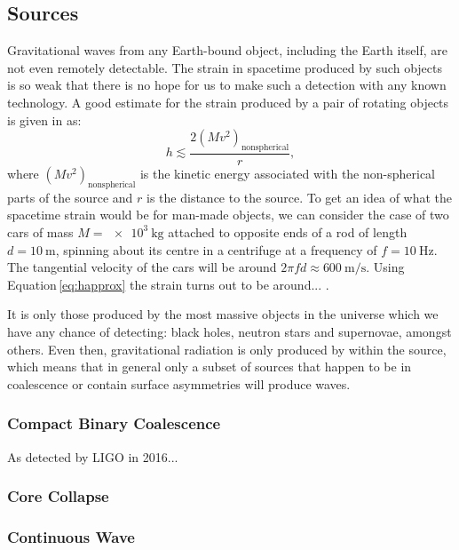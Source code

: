 \subsection{Sources}
Gravitational waves from any Earth-bound object, including the Earth itself, are not even remotely detectable. The strain in spacetime produced by such objects is so weak that there is no hope for us to make such a detection with any known technology. A good estimate for the strain produced by a pair of rotating objects is given in \cite{Sathyaprakash2009} as:
\begin{equation}
  \label{eq:happrox}
  h \lesssim \frac{2 \left( M v^{2} \right)_{\text{nonspherical}}}{r},
\end{equation}
where $\left( M v^{2} \right)_{\text{nonspherical}}$ is the kinetic energy associated with the non-spherical parts of the source and $r$ is the distance to the source. To get an idea of what the spacetime strain would be for man-made objects, we can consider the case of two cars of mass $M = \SI{e3}{\kilo\gram}$ attached to opposite ends of a rod of length $d = \SI{10}{\meter}$, spinning about its centre in a centrifuge at a frequency of $f = \SI{10}{\hertz}$. The tangential velocity of the cars will be around $2 \pi f d \approx \SI{600}{\meter\per\second}$. Using Equation\,\ref{eq:happrox} the strain turns out to be around... .

It is only those produced by the most massive objects in the universe which we have any chance of detecting: black holes, neutron stars and supernovae, amongst others. Even then, gravitational radiation is only produced by  within the source, which means that in general only a subset of sources that happen to be in coalescence or contain surface asymmetries will produce waves.

\subsubsection{Compact Binary Coalescence}
As detected by LIGO in 2016...


\subsubsection{Core Collapse}

\subsubsection{Continuous Wave}

